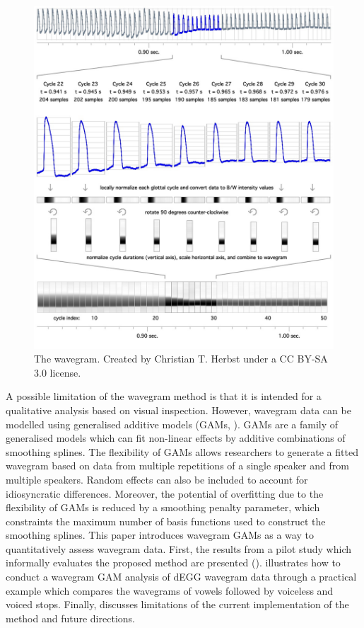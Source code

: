 \documentclass[
  12pt,
  a4paper,
]{article}
\begin{document}
\begin{figure}
  \includegraphics{./img/wavegram.png}
  \caption{The wavegram. Created by Christian T. Herbst under a CC BY-SA 3.0 license.}
  \label{f:wavegram}
\end{figure}

A possible limitation of the wavegram method is that it is intended for
a qualitative analysis based on visual inspection. However, wavegram
data can be modelled using generalised additive models (GAMs,
\citealt{hastie1986, zuur2012, wood2017}). GAMs are a family of
generalised models which can fit non-linear effects by additive
combinations of smoothing splines. The flexibility of GAMs allows
researchers to generate a fitted wavegram based on data from multiple
repetitions of a single speaker and from multiple speakers. Random
effects can also be included to account for idiosyncratic differences.
Moreover, the potential of overfitting due to the flexibility of GAMs is
reduced by a smoothing penalty parameter, which constraints the maximum
number of basis functions used to construct the smoothing splines. This
paper introduces wavegram GAMs as a way to quantitatively assess
wavegram data. First, the results from a pilot study which informally
evaluates the proposed method are presented ().
 illustrates how to conduct a wavegram GAM analysis of
dEGG wavegram data through a practical example which compares the
wavegrams of vowels followed by voiceless and voiced stops. Finally,
 discusses limitations of the current implementation of
the method and future directions.
\end{document}

